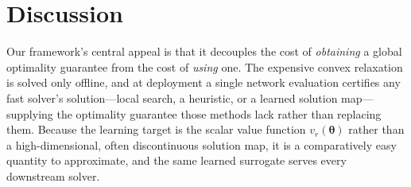 \documentclass[10pt]{article} %
\theoremstyle{plain}
\theoremstyle{definition}
\theoremstyle{remark}
\begin{document}

\section{Discussion} \label{sec:discussion}

Our framework's central appeal is that it decouples the cost of \emph{obtaining} a
global optimality guarantee from the cost of \emph{using} one. The expensive
convex relaxation is solved only offline, and at deployment a single network
evaluation certifies any fast solver's solution---local search, a heuristic, or a
learned solution map---supplying the optimality guarantee those methods lack
rather than replacing them. Because the learning target is the scalar value
function $v_r(\bm{\theta})$ rather than a high-dimensional, often discontinuous
solution map, it is a comparatively easy quantity to approximate, and the same
learned surrogate serves every downstream solver.
\end{document}
